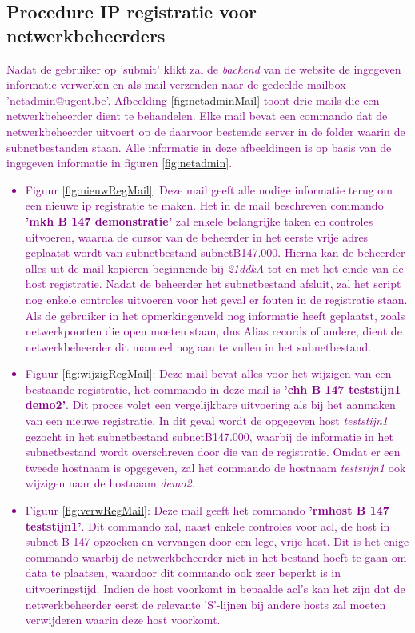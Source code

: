 \subsection{Procedure IP registratie voor netwerkbeheerders}
\textcolor{purple}{Nadat de gebruiker op 'submit' klikt zal de \textit{backend} van de website de ingegeven informatie verwerken en als mail verzenden naar de gedeelde mailbox 'netadmin@ugent.be'. Afbeelding \ref{fig:netadminMail} toont drie mails die een netwerkbeheerder dient te behandelen. Elke mail bevat een commando dat de netwerkbeheerder uitvoert op de daarvoor bestemde server in de folder waarin de subnetbestanden staan. Alle informatie in deze afbeeldingen is op basis van de ingegeven informatie in figuren \ref{fig:netadmin}.}
\textcolor{purple}{
    \begin{itemize}
        \item Figuur \ref{fig:nieuwRegMail}: Deze mail geeft alle nodige informatie terug om een nieuwe \acrshort{ip} registratie te maken. Het in de mail beschreven commando \textbf{'mkh B 147 demonstratie'} zal enkele belangrijke taken en controles uitvoeren, waarna de cursor van de beheerder in het eerste vrije adres geplaatst wordt van subnetbestand subnetB147.000. Hierna kan de beheerder alles uit de mail kopiëren beginnende bij \textit{21ddkA} tot en met het einde van de host registratie. Nadat de beheerder het subnetbestand afsluit, zal het script nog enkele controles uitvoeren voor het geval er fouten in de registratie staan. Als de gebruiker in het opmerkingenveld nog informatie heeft geplaatst, zoals netwerkpoorten die open moeten staan, \acrshort{dns} Alias records of andere, dient de netwerkbeheerder dit manueel nog aan te vullen in het subnetbestand.
        \item Figuur \ref{fig:wijzigRegMail}: Deze mail bevat alles voor het wijzigen van een bestaande registratie, het commando in deze mail is \textbf{'chh B 147 teststijn1 demo2'}. Dit proces volgt een vergelijkbare uitvoering als bij het aanmaken van een nieuwe registratie. In dit geval wordt de opgegeven host \textit{teststijn1} gezocht in het subnetbestand subnetB147.000, waarbij de informatie in het subnetbestand wordt overschreven door die van de registratie. Omdat er een tweede hostnaam is opgegeven, zal het commando de hostnaam \textit{teststijn1} ook wijzigen naar de hostnaam \textit{demo2}.
        \item Figuur \ref{fig:verwRegMail}: Deze mail geeft het commando \textbf{'rmhost B 147 teststijn1'}. Dit commando zal, naast enkele controles voor \acrshort{acl}, de host in subnet B 147 opzoeken en vervangen door een lege, vrije host. Dit is het enige commando waarbij de netwerkbeheerder niet in het bestand hoeft te gaan om data te plaatsen, waardoor dit commando ook zeer beperkt is in uitvoeringstijd. Indien de host voorkomt in bepaalde \acrshort{acl}'s kan het zijn dat de netwerkbeheerder eerst de relevante 'S'-lijnen bij andere hosts zal moeten verwijderen waarin deze host voorkomt.
\end{itemize}}

